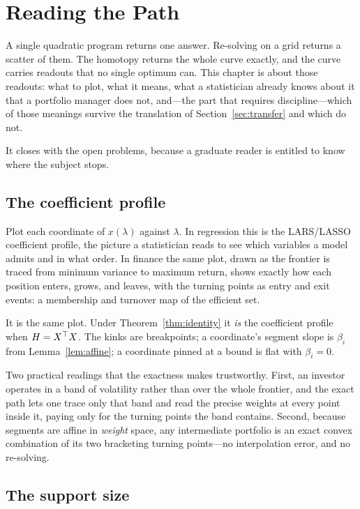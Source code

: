 \chapter{Reading the Path}
\label{ch:reading}

A single quadratic program returns one answer. Re-solving on a grid returns a
scatter of them. The homotopy returns the whole curve exactly, and the curve carries
readouts that no single optimum can. This chapter is about those readouts: what to
plot, what it means, what a statistician already knows about it that a portfolio
manager does not, and---the part that requires discipline---which of those meanings
survive the translation of Section~\ref{sec:transfer} and which do not.

It closes with the open problems, because a graduate reader is entitled to know
where the subject stops.

\section{The coefficient profile}

Plot each coordinate of $x(\lambda)$ against $\lambda$. In regression this is the
LARS/LASSO coefficient profile, the picture a statistician reads to see which
variables a model admits and in what order. In finance the same plot, drawn as the
frontier is traced from minimum variance to maximum return, shows exactly how each
position enters, grows, and leaves, with the turning points as entry and exit events:
a membership and turnover map of the efficient set.

It is the same plot. Under Theorem~\ref{thm:identity} it \emph{is} the coefficient
profile when $H = X^{\top} X$. The kinks are breakpoints; a coordinate's segment slope is
$\beta_i$ from Lemma~\ref{lem:affine}; a coordinate pinned at a bound is flat with
$\beta_i = 0$.

Two practical readings that the exactness makes trustworthy. First, an investor
operates in a band of volatility rather than over the whole frontier, and the exact
path lets one trace only that band and read the precise weights at every point inside
it, paying only for the turning points the band contains. Second, because segments
are affine in \emph{weight} space, any intermediate portfolio is an exact convex
combination of its two bracketing turning points---no interpolation error, and no
re-solving.

\section{The support size}

